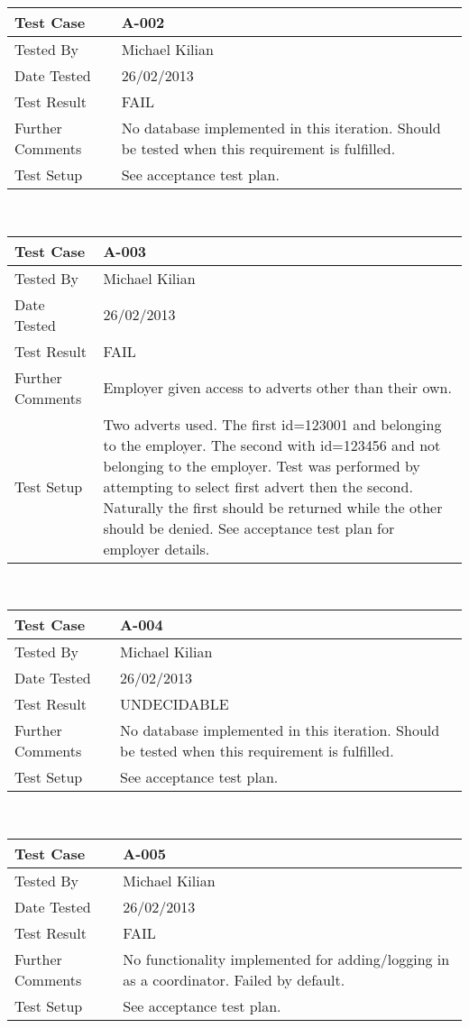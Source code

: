 \documentclass{l3deliverable}
\begin{document}
\begin{tabular}{lp{10cm}}
\hline 
\textbf{Test Case} & A-002\tabularnewline
\hline 
\hline 
Tested By & Michael Kilian\tabularnewline
\hline 
Date Tested & 26/02/2013\tabularnewline
\hline 
Test Result & FAIL\tabularnewline
\hline
Further Comments &  No database implemented in this iteration. Should be tested when this requirement is fulfilled. \tabularnewline
\hline
Test Setup &  See acceptance test plan. \tabularnewline
\hline
\end{tabular}\\

\begin{tabular}{lp{10cm}}
\hline 
\textbf{Test Case} & A-003\tabularnewline
\hline 
\hline 
Tested By & Michael Kilian\tabularnewline
\hline 
Date Tested & 26/02/2013\tabularnewline
\hline 
Test Result & FAIL\tabularnewline
\hline
Further Comments &  Employer given access to adverts other than their own. \tabularnewline
\hline
Test Setup &  Two adverts used. The first id=123001 and belonging to the employer. The second with id=123456 and not belonging to the employer. Test was performed by attempting to select first advert then the second. Naturally the first should be returned while the other should be denied. See acceptance test plan for employer details. \tabularnewline
\hline
\end{tabular}\\

\begin{tabular}{lp{10cm}}
\hline 
\textbf{Test Case} & A-004\tabularnewline
\hline 
\hline 
Tested By & Michael Kilian\tabularnewline
\hline 
Date Tested & 26/02/2013\tabularnewline
\hline 
Test Result & UNDECIDABLE\tabularnewline
\hline
Further Comments &  No database implemented in this iteration. Should be tested when this requirement is fulfilled. \tabularnewline
\hline
Test Setup &  See acceptance test plan. \tabularnewline
\hline
\end{tabular}\\

\begin{tabular}{lp{10cm}}
\hline 
\textbf{Test Case} & A-005\tabularnewline
\hline 
\hline 
Tested By & Michael Kilian\tabularnewline
\hline 
Date Tested & 26/02/2013\tabularnewline
\hline 
Test Result & FAIL\tabularnewline
\hline
Further Comments &  No functionality implemented for adding/logging in as a coordinator. Failed by default. \tabularnewline
\hline
Test Setup &  See acceptance test plan. \tabularnewline
\hline
\end{tabular}\\
\end{document}
